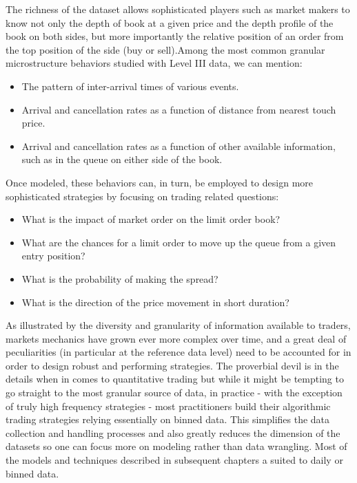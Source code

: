 The richness of the dataset allows sophisticated players such as market makers to know not only the depth of book at a given price and the depth profile of the book on both sides, but more importantly the relative position of an order from the top position of the side (buy or sell).Among the most common granular microstructure behaviors studied with Level III data, we can mention:
        \begin{itemize}
        \item The pattern of inter-arrival times of various events.
        \item Arrival and cancellation rates as a function of distance from nearest touch price.
        \item Arrival and cancellation rates as a function of other available information, such as in the queue on either side of the book.
        \end{itemize}
Once modeled, these behaviors can, in turn, be employed to design more sophisticated strategies by focusing on trading related questions:
        \begin{itemize}
        \item What is the impact of market order on the limit order book?
        \item What are the chances for a limit order to move up the queue from a given entry position?
        \item What is the probability of making the spread?
        \item What is the direction of the price movement in short duration?
        \end{itemize}

As illustrated by the diversity and granularity of information available to traders, markets mechanics have grown ever more complex over time, and a great deal of peculiarities (in particular at the reference data level) need to be accounted for in order to design robust and performing strategies. The proverbial devil is in the details when in comes to quantitative trading but while it might be tempting to go straight to the most granular source of data, in practice - with the exception of truly high frequency strategies - most practitioners build their algorithmic trading strategies relying essentially on binned data. This simplifies the data collection and handling processes and also greatly reduces the dimension of the datasets so one can focus more on modeling rather than data wrangling. Most of the models and techniques described in subsequent chapters a suited to daily or binned data.


